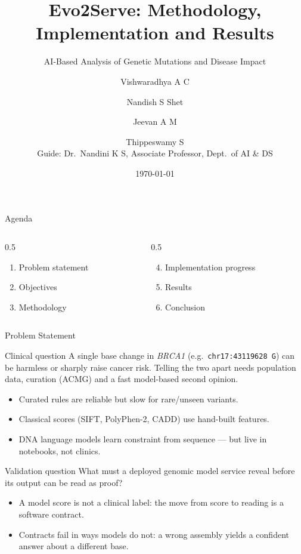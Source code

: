 \documentclass[aspectratio=169,10pt]{beamer}
\title[Evo2Serve]{Evo2Serve: Methodology, Implementation and Results}
\subtitle{AI-Based Analysis of Genetic Mutations and Disease Impact}
\author[Vishwaradhya \and Nandish \and Jeevan \and Thippeswamy]{Vishwaradhya A C \and Nandish S Shet \and Jeevan A M \and Thippeswamy S \\[0.3em] {\small Guide: Dr.\ Nandini K S, Associate Professor, Dept.\ of AI \& DS}}
\institute[Don Bosco Institute of Technology]{Department of Artificial Intelligence and Data Science \\ Don Bosco Institute of Technology, Bengaluru}
\date{\today}
\begin{document}
\begin{frame}
\titlepage
\end{frame}

\begin{frame}{Agenda}
\begin{columns}[T]
\begin{column}{0.5\textwidth}
\begin{enumerate}
\item Problem statement
\item Objectives
\item Methodology
\end{enumerate}
\end{column}
\begin{column}{0.5\textwidth}
\begin{enumerate}\setcounter{enumi}{3}
\item Implementation progress
\item Results
\item Conclusion
\end{enumerate}
\end{column}
\end{columns}
\end{frame}

\begin{frame}{Problem Statement}
\begin{block}{Clinical question}
A single base change in \textit{BRCA1} (e.g.\ \texttt{chr17:43119628 G}) can be harmless or sharply raise cancer risk. Telling the two apart needs population data, curation (ACMG) and a fast model-based second opinion.
\end{block}
\begin{itemize}
\item Curated rules are reliable but slow for rare/unseen variants.
\item Classical scores (SIFT, PolyPhen-2, CADD) use hand-built features.
\item DNA language models learn constraint from sequence --- but live in notebooks, not clinics.
\end{itemize}
\begin{block}{Validation question}
What must a deployed genomic model service reveal before its output can be read as proof?
\end{block}
\begin{itemize}
\item A model score is not a clinical label: the move from score to reading is a software contract.
\item Contracts fail in ways models do not: a wrong assembly yields a confident answer about a different base.
\end{itemize}
\end{frame}
\end{document}

